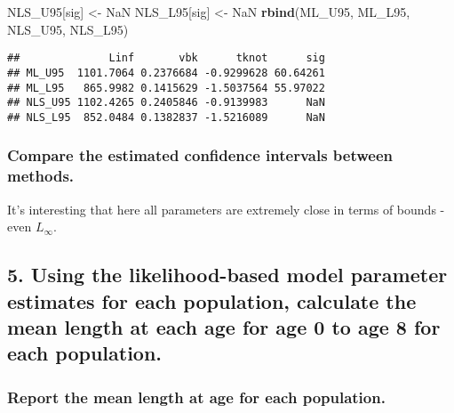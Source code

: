 \documentclass[
]{article}
\newenvironment{Shaded}{\begin{snugshade}}{\end{snugshade}}
\newcommand{\KeywordTok}[1]{\textcolor[rgb]{0.13,0.29,0.53}{\textbf{#1}}}
\newcommand{\NormalTok}[1]{#1}
\newcommand{\OtherTok}[1]{\textcolor[rgb]{0.56,0.35,0.01}{#1}}
\newcommand{\StringTok}[1]{\textcolor[rgb]{0.31,0.60,0.02}{#1}}
\begin{document}
\begin{Shaded}
\begin{Highlighting}[]
\NormalTok{NLS\_U95[}\StringTok{\textquotesingle{}sig\textquotesingle{}}\NormalTok{] \textless{}{-}}\StringTok{ }\OtherTok{NaN}
\NormalTok{NLS\_L95[}\StringTok{\textquotesingle{}sig\textquotesingle{}}\NormalTok{] \textless{}{-}}\StringTok{ }\OtherTok{NaN}
\KeywordTok{rbind}\NormalTok{(ML\_U95, ML\_L95, NLS\_U95, NLS\_L95)}
\end{Highlighting}
\end{Shaded}

\begin{verbatim}
##              Linf       vbk      tknot      sig
## ML_U95  1101.7064 0.2376684 -0.9299628 60.64261
## ML_L95   865.9982 0.1415629 -1.5037564 55.97022
## NLS_U95 1102.4265 0.2405846 -0.9139983      NaN
## NLS_L95  852.0484 0.1382837 -1.5216089      NaN
\end{verbatim}

\hypertarget{compare-the-estimated-confidence-intervals-between-methods.-1}{%
\subsubsection{Compare the estimated confidence intervals between
methods.}\label{compare-the-estimated-confidence-intervals-between-methods.-1}}

It's interesting that here all parameters are extremely close in terms
of bounds - even \(L_{\infty}\).

\hypertarget{using-the-likelihood-based-model-parameter-estimates-for-each-population-calculate-the-mean-length-at-each-age-for-age-0-to-age-8-for-each-population.}{%
\subsection{5. Using the likelihood-based model parameter estimates for
each population, calculate the mean length at each age for age 0 to age
8 for each
population.}\label{using-the-likelihood-based-model-parameter-estimates-for-each-population-calculate-the-mean-length-at-each-age-for-age-0-to-age-8-for-each-population.}}

\hypertarget{report-the-mean-length-at-age-for-each-population.}{%
\subsubsection{Report the mean length at age for each
population.}\label{report-the-mean-length-at-age-for-each-population.}}
\end{document}
